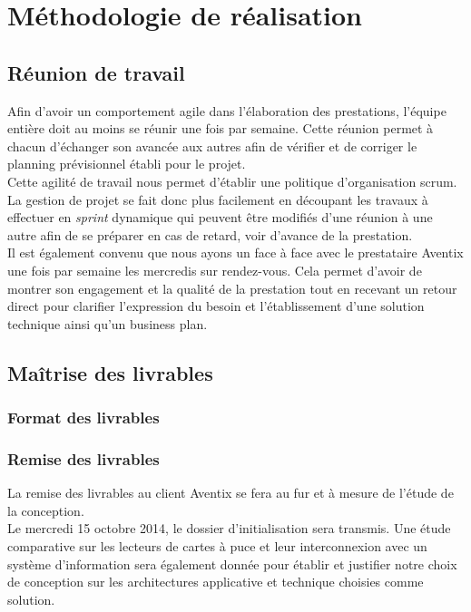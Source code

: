 \documentclass[11pt, a4paper]{article}
\begin{document}
\section{Méthodologie de réalisation}
\subsection{Réunion de travail}
Afin d'avoir un comportement agile dans l'élaboration des prestations, l'équipe
entière doit au moins se réunir une fois par semaine.
Cette réunion permet à chacun d'échanger son avancée aux autres afin de
vérifier et de corriger le planning prévisionnel établi pour le projet. \\

Cette agilité de travail nous permet d'établir une politique d'organisation scrum.
La gestion de projet se fait donc plus facilement en découpant les travaux à
effectuer en \textit{sprint} dynamique qui peuvent être modifiés d'une réunion
à une autre afin de se préparer en cas de retard, voir d'avance de la
prestation. \\

Il est également convenu que nous ayons un face à face avec le prestataire
Aventix une fois par semaine les mercredis sur rendez-vous. Cela permet d'avoir
de montrer son engagement et la qualité de la prestation tout en recevant un
retour direct pour clarifier l'expression du besoin et l'établissement d'une
solution technique ainsi qu'un business plan. \\

\subsection{Maîtrise des livrables}
\subsubsection{Format des livrables}

\subsubsection{Remise des livrables}
La remise des livrables au client Aventix se fera au fur et à mesure de l'étude
de la conception. \\

Le mercredi 15 octobre 2014, le dossier d'initialisation sera transmis.
Une étude comparative sur les lecteurs de cartes à puce et leur interconnexion
avec un système d'information sera également donnée pour établir et justifier
notre choix de conception sur les architectures applicative et technique
choisies comme solution. \\
\end{document}
